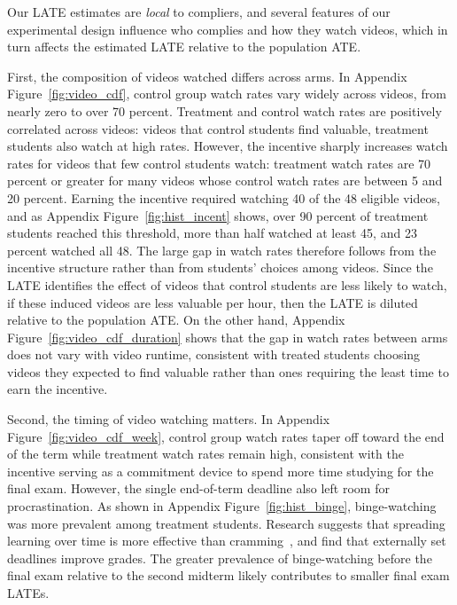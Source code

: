 Our LATE estimates are \textit{local} to compliers, and several features of our experimental design influence who complies and how they watch videos, which in turn affects the estimated LATE relative to the population ATE.

First, the composition of videos watched differs across arms.
In Appendix Figure~\ref{fig:video_cdf}, control group watch rates vary widely across videos, from nearly zero to over 70 percent.
Treatment and control watch rates are positively correlated across videos: videos that control students find valuable, treatment students also watch at high rates.
However, the incentive sharply increases watch rates for videos that few control students watch: treatment watch rates are 70 percent or greater for many videos whose control watch rates are between 5 and 20 percent.
Earning the incentive required watching 40 of the 48 eligible videos, and as Appendix Figure~\ref{fig:hist_incent} shows, over 90 percent of treatment students reached this threshold, more than half watched at least 45, and 23 percent watched all 48.
The large gap in watch rates therefore follows from the incentive structure rather than from students' choices among videos.
Since the LATE identifies the effect of videos that control students are less likely to watch, if these induced videos are less valuable per hour, then the LATE is diluted relative to the population ATE.
On the other hand, Appendix Figure~\ref{fig:video_cdf_duration} shows that the gap in watch rates between arms does not vary with video runtime, consistent with treated students choosing videos they expected to find valuable rather than ones requiring the least time to earn the incentive.

Second, the timing of video watching matters.
In Appendix Figure~\ref{fig:video_cdf_week}, control group watch rates taper off toward the end of the term while treatment watch rates remain high, consistent with the incentive serving as a commitment device to spend more time studying for the final exam.
However, the single end-of-term deadline also left room for procrastination.
As shown in Appendix Figure~\ref{fig:hist_binge}, binge-watching was more prevalent among treatment students.
Research suggests that spreading learning over time is more effective than cramming~\parencite{kornell2009}, and \textcite{aw2002} find that externally set deadlines improve grades.
The greater prevalence of binge-watching before the final exam relative to the second midterm likely contributes to smaller final exam LATEs.

